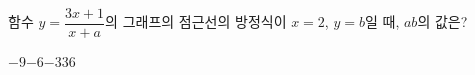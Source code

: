 함수 $y=\dfrac{3x+1}{x+a}$의 그래프의 점근선의 방정식이 $x=2$, $y=b$일 때, $ab$의 값은? 
\begin{choices32}{$-9$}{$-6$}{$-3$}{$3$}{$6$}\end{choices32}
